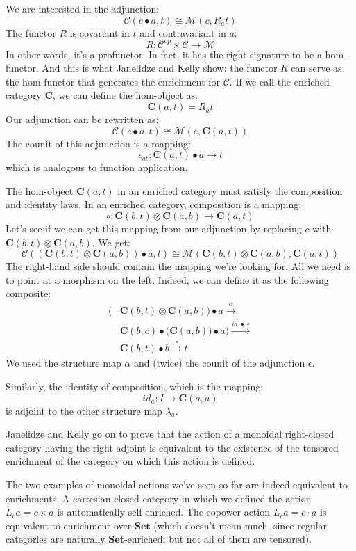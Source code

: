 \documentclass[11pt]{amsart}
\begin{document}
We are interested in the adjunction:
\[ \mathcal{C}( c \bullet a, t) \cong \mathcal{M}(c, R_a t) \]
The functor $R$ is covariant in $t$ and contravariant in $a$:
\[ R \colon \mathcal{C}^{op} \times \mathcal{C} \to \mathcal{M} \]
In other words, it's a profunctor. In fact, it has the right signature to be a hom-functor. And this is what Janelidze and Kelly show: the functor $R$ can serve as the hom-functor that generates the enrichment for $\mathcal{C}$. If we call the enriched category $\mathbf{C}$, we can define the hom-object as:
\[\mathbf{C}(a, t) = R_a t \]
Our adjunction can be rewritten as:
\[ \mathcal{C}( c \bullet a, t) \cong \mathcal{M}(c, \mathbf{C}(a, t)) \]
The counit of this adjunction is a mapping:
\[ \epsilon_{a t} \colon \mathbf{C}(a, t)  \bullet a \to t \]
which is analogous to function application.

The hom-object $\mathbf{C}(a, t)$ in an enriched category must satisfy the composition and identity laws. In an enriched category, composition is a mapping:
\[ \circ \colon \mathbf{C}(b, t) \otimes \mathbf{C}(a, b) \to \mathbf{C}(a, t) \]
Let's see if we can get this mapping from our adjunction by replacing $c$ with $\mathbf{C}(b, t) \otimes \mathbf{C}(a, b)$. We get:
\[ \mathcal{C}( (\mathbf{C}(b, t) \otimes \mathbf{C}(a, b)) \bullet a, t) \cong \mathcal{M}(\mathbf{C}(b, t) \otimes \mathbf{C}(a, b), \mathbf{C}(a, t)) \]
The right-hand side should contain the mapping we're looking for. All we need is to point at a morphism on the left. Indeed, we can define it as the following composite:
\begin{align*}
\big( & \mathbf{C}(b, t) \otimes \mathbf{C}(a, b)\big) \bullet a  \xrightarrow{\alpha}
\\ &\mathbf{C}(b, c) \bullet \big(\mathbf{C}(a, b)) \bullet a\big)   \xrightarrow{id \; \bullet \; \epsilon}
\\ &\mathbf{C}(b, t) \bullet b  \xrightarrow{\epsilon} t
\end{align*}
We used the structure map $\alpha$ and (twice) the counit of the adjunction $\epsilon$.

Similarly, the identity of composition, which is the mapping:
\[ id_a \colon I \to \mathbf{C}(a, a) \]
is adjoint to the other structure map $\lambda_a$.

Janelidze and Kelly go on to prove that the action of a monoidal right-closed category having the right adjoint is equivalent to the existence of the tensored enrichment of the category on which this action is defined.

The two examples of monoidal actions we've seen so far are indeed equivalent to enrichments. A cartesian closed category in which we defined the action $L_c a = c \times a$ is automatically self-enriched. The copower action $L_c a = c \cdot a$ is equivalent to enrichment over $\mathbf{Set}$ (which doesn't mean much, since regular categories are naturally $\mathbf{Set}$-enriched; but not all of them are tensored).
\end{document}
